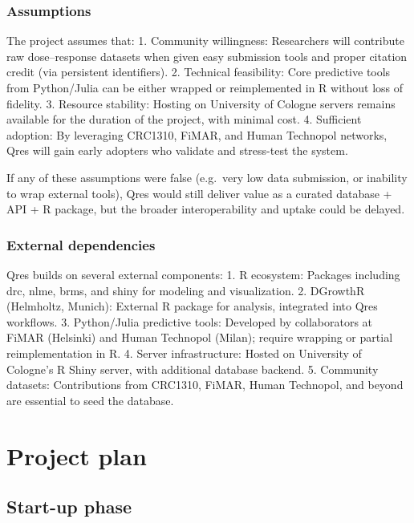 \documentclass[
]{article}
\begin{document}
\subsubsection{Assumptions}\label{assumptions}

The project assumes that: 1. Community willingness: Researchers will
contribute raw dose--response datasets when given easy submission tools
and proper citation credit (via persistent identifiers). 2. Technical
feasibility: Core predictive tools from Python/Julia can be either
wrapped or reimplemented in R without loss of fidelity. 3. Resource
stability: Hosting on University of Cologne servers remains available
for the duration of the project, with minimal cost. 4. Sufficient
adoption: By leveraging CRC1310, FiMAR, and Human Technopol networks,
Qres will gain early adopters who validate and stress-test the system.

If any of these assumptions were false (e.g.~very low data submission,
or inability to wrap external tools), Qres would still deliver value as
a curated database + API + R package, but the broader interoperability
and uptake could be delayed.

\subsubsection{External dependencies}\label{external-dependencies}

Qres builds on several external components: 1. R ecosystem: Packages
including drc, nlme, brms, and shiny for modeling and visualization. 2.
DGrowthR (Helmholtz, Munich): External R package for analysis,
integrated into Qres workflows. 3. Python/Julia predictive tools:
Developed by collaborators at FiMAR (Helsinki) and Human Technopol
(Milan); require wrapping or partial reimplementation in R. 4. Server
infrastructure: Hosted on University of Cologne's R Shiny server, with
additional database backend. 5. Community datasets: Contributions from
CRC1310, FiMAR, Human Technopol, and beyond are essential to seed the
database.

\section{Project plan}\label{project-plan}

\subsection{Start-up phase}\label{start-up-phase}
\end{document}
